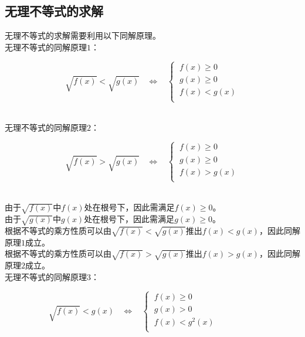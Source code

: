 \documentclass[UTF8]{ctexart}
\begin{document}
\subsection{无理不等式的求解}
    无理不等式的求解需要利用以下同解原理。\\[3mm]
    无理不等式的同解原理$1$：
    \begin{large}
        \begin{equation*}
            \sqrt{f(x)}<\sqrt{g(x)}~~~~\Longleftrightarrow~~~~
            \begin{cases}
                ~f(x)\geq 0\\[1mm]
                ~g(x)\geq 0\\[1mm]
                ~f(x)<g(x)\\[1mm]
            \end{cases}
        \end{equation*}
    \end{large}\\
    无理不等式的同解原理$2$：
    \begin{large}
        \begin{equation*}
            \sqrt{f(x)}>\sqrt{g(x)}~~~~\Longleftrightarrow~~~~
            \begin{cases}
                ~f(x)\geq 0\\[1mm]
                ~g(x)\geq 0\\[1mm]
                ~f(x)>g(x)\\[1mm]
            \end{cases}
        \end{equation*}
    \end{large}\\
    由于$\sqrt{f(x)}$中$f(x)$处在根号下，因此需满足$f(x)\geq 0$。\\[3mm]
    由于$\sqrt{g(x)}$中$g(x)$处在根号下，因此需满足$g(x)\geq 0$。\\[3mm]
    根据不等式的乘方性质可以由$\sqrt{f(x)}<\sqrt{g(x)}$推出$f(x)<g(x)$，因此同解原理$1$成立。\\[3mm]
    根据不等式的乘方性质可以由$\sqrt{f(x)}>\sqrt{g(x)}$推出$f(x)>g(x)$，因此同解原理$2$成立。\\[6mm]
    无理不等式的同解原理$3$：
    \begin{large}
        \begin{equation*}
            \sqrt{f(x)}<g(x)~~~~\Longleftrightarrow~~~~
            \begin{cases}
                ~f(x)\geq 0\\[1mm]
                ~g(x)> 0\\[1mm]
                ~f(x)<g^2(x)\\[1mm]
            \end{cases}~~~~~~~~~~~~~~~~~~~~\;
        \end{equation*}
    \end{large}\\
\end{document}
